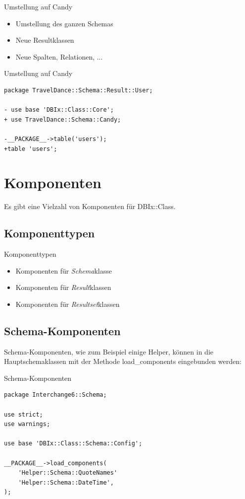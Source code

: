 \begin{frame}[fragile]{Umstellung auf Candy}
  \begin{itemize}
  \item Umstellung des ganzen Schemas
  \item Neue Resultklassen
  \item Neue Spalten, Relationen, ...
  \end{itemize}
\end{frame}

\begin{frame}[fragile]{Umstellung auf Candy}
  \begin{lstlisting}
package TravelDance::Schema::Result::User;

- use base 'DBIx::Class::Core';
+ use TravelDance::Schema::Candy;

-__PACKAGE__->table('users');
+table 'users';

\end{lstlisting}
\end{frame}

\section{Komponenten}

Es gibt eine Vielzahl von Komponenten für DBIx::Class.

\subsection{Komponenttypen}

\begin{frame}[fragile]{Komponenttypen}
  \begin{itemize}
  \item Komponenten für \emph{Schema}klasse
  \item Komponenten für \emph{Result}klassen
  \item Komponenten für \emph{Resultset}klassen
  \end{itemize}
\end{frame}

\subsection{Schema-Komponenten}

Schema-Komponenten, wie zum Beispiel einige Helper, können in die
Hauptschemaklassen mit der Methode load\_components eingebunden werden:

\begin{frame}[fragile]{Schema-Komponenten}
  \begin{lstlisting}
package Interchange6::Schema;

use strict;
use warnings;

use base 'DBIx::Class::Schema::Config';

__PACKAGE__->load_components(
    'Helper::Schema::QuoteNames'
    'Helper::Schema::DateTime',
);
\end{lstlisting}
\end{frame}

